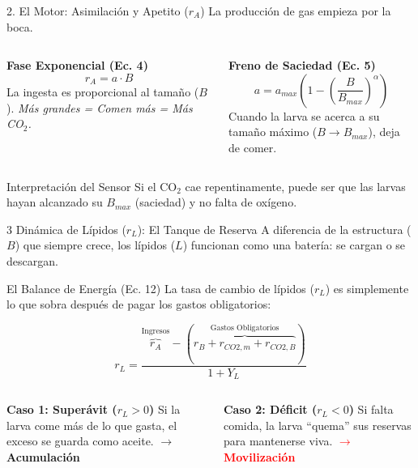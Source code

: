\documentclass[aspectratio=169, 10pt]{beamer}
\begin{document}
\begin{frame}{2. El Motor: Asimilación y Apetito ($r_A$)}
    La producción de gas empieza por la boca.

    \vspace{0.2cm}
    \begin{columns}[T]
        \textbf{Fase Exponencial (Ec. 4)}
        $$ r_A = a \cdot B $$
        \small La ingesta es proporcional al tamaño ($B$).
        \textit{Más grandes = Comen más = Más CO$_2$.}

        \textbf{Freno de Saciedad (Ec. 5)}
        $$ a = a_{max} \left( 1 - \left( \frac{B}{B_{max}} \right)^\alpha \right) $$
        \small Cuando la larva se acerca a su tamaño máximo ($B \to B_{max}$), deja de comer.
    \end{columns}

    \vspace{0.4cm}
    \centering
    \begin{alertblock}{Interpretación del Sensor}
        Si el CO$_2$ cae repentinamente, puede ser que las larvas hayan alcanzado su $B_{max}$ (saciedad) y no falta de oxígeno.
    \end{alertblock}
\end{frame}

\begin{frame}{3 Dinámica de Lípidos ($r_L$): El Tanque de Reserva}
    A diferencia de la estructura ($B$) que siempre crece, los lípidos ($L$) funcionan como una batería: se cargan o se descargan.

    \begin{block}{El Balance de Energía (Ec. 12)}
        La tasa de cambio de lípidos ($r_L$) es simplemente lo que sobra después de pagar los gastos obligatorios:

        \vspace{0.2em}
        \centering
        \large
        $$ r_L = \frac{\overbrace{r_A}^{\text{Ingresos}} - (\overbrace{r_B + r_{CO2,m} + r_{CO2,B}}^{\text{Gastos Obligatorios}})}{1 + Y_L} $$
    \end{block}

    \vspace{0.3cm}
    \begin{columns}[T]
        \textbf{Caso 1: Superávit ($r_L > 0$)}
        \small
        Si la larva come más de lo que gasta, el exceso se guarda como aceite.
        \textcolor{green!60!black}{\textbf{$\rightarrow$ Acumulación}}

        \textbf{Caso 2: Déficit ($r_L < 0$)}
        \small
        Si falta comida, la larva ``quema'' sus reservas para mantenerse viva.
        \textcolor{red}{\textbf{$\rightarrow$ Movilización}}
    \end{columns}
\end{frame}
\end{document}
